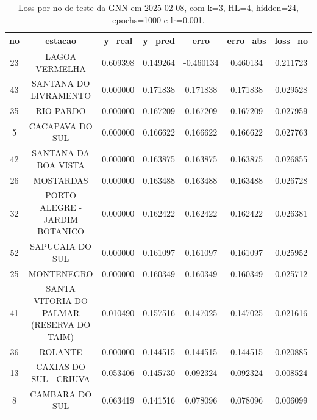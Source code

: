 \begin{table}[h]
\centering
\caption{Loss por no de teste da GNN em 2025-02-08, com k=3, HL=4, hidden=24, epochs=1000 e lr=0.001.}
\label{tab:gnn_loss_k3_hl4_h24_e1000_d20250208}
\begin{tabular}{ccccccc}
\toprule
no & estacao & y\_real & y\_pred & erro & erro\_abs & loss\_no \\
\midrule
23 & LAGOA VERMELHA & 0.609398 & 0.149264 & -0.460134 & 0.460134 & 0.211723 \\
43 & SANTANA DO LIVRAMENTO & 0.000000 & 0.171838 & 0.171838 & 0.171838 & 0.029528 \\
35 & RIO PARDO & 0.000000 & 0.167209 & 0.167209 & 0.167209 & 0.027959 \\
5 & CACAPAVA DO SUL & 0.000000 & 0.166622 & 0.166622 & 0.166622 & 0.027763 \\
42 & SANTANA DA BOA VISTA & 0.000000 & 0.163875 & 0.163875 & 0.163875 & 0.026855 \\
26 & MOSTARDAS & 0.000000 & 0.163488 & 0.163488 & 0.163488 & 0.026728 \\
32 & PORTO ALEGRE - JARDIM BOTANICO & 0.000000 & 0.162422 & 0.162422 & 0.162422 & 0.026381 \\
52 & SAPUCAIA DO SUL & 0.000000 & 0.161097 & 0.161097 & 0.161097 & 0.025952 \\
25 & MONTENEGRO & 0.000000 & 0.160349 & 0.160349 & 0.160349 & 0.025712 \\
41 & SANTA VITORIA DO PALMAR (RESERVA DO TAIM) & 0.010490 & 0.157516 & 0.147025 & 0.147025 & 0.021616 \\
36 & ROLANTE & 0.000000 & 0.144515 & 0.144515 & 0.144515 & 0.020885 \\
13 & CAXIAS DO SUL - CRIUVA & 0.053406 & 0.145730 & 0.092324 & 0.092324 & 0.008524 \\
8 & CAMBARA DO SUL & 0.063419 & 0.141516 & 0.078096 & 0.078096 & 0.006099 \\
\bottomrule
\end{tabular}
\end{table}
